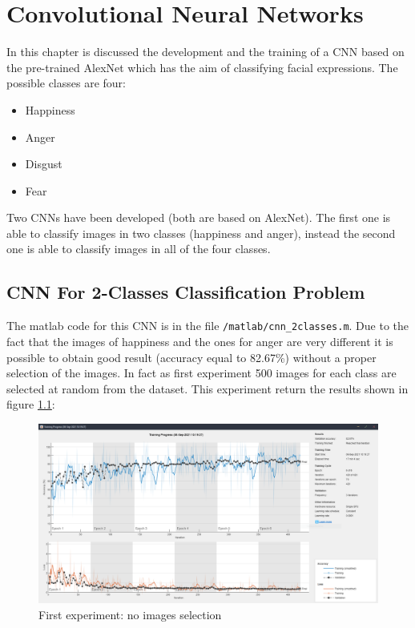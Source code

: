 \documentclass[a4paper]{report}
\begin{document}
\chapter{Convolutional Neural Networks}
\label{chap: CNN}
	\noindent In this chapter is discussed the development and the training of a CNN based on the pre-trained AlexNet which has the aim of classifying facial expressions. The possible classes are four:
	\begin{itemize}
		\item Happiness
		\item Anger
		\item Disgust
		\item Fear
	\end{itemize} 
	\noindent Two CNNs have been developed (both are based on AlexNet). The first one is able to classify images in two classes (happiness and anger), instead the second one is able to classify images in all of the four classes.
	
	\section{CNN For 2-Classes Classification Problem}
	\noindent The matlab code for this CNN is in the file \texttt{/matlab/cnn\_2classes.m}. Due to the fact that the images of happiness and the ones for anger are very different it is possible to obtain good result (accuracy equal to 82.67\%) without a proper selection of the images.
	\noindent In fact as first experiment 500 images for each class are selected at random from the dataset. This experiment return the results shown in figure \ref{img: trainingCnnTwoClasses}:
	
	\begin{figure}[htbp]
		\centering
		\includegraphics[scale=0.31]{img/trainingCnnTwoClasses.png}
		\caption{First experiment: no images selection}
		\label{img: trainingCnnTwoClasses}
	\end{figure}
\end{document}
